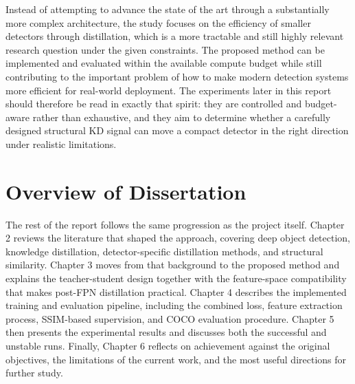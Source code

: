 Instead of attempting to advance the state of the art through a substantially more complex architecture, the study focuses on the efficiency of smaller detectors through distillation, which is a more tractable and still highly relevant research question under the given constraints. The proposed method can be implemented and evaluated within the available compute budget while still contributing to the important problem of how to make modern detection systems more efficient for real-world deployment. The experiments later in this report should therefore be read in exactly that spirit: they are controlled and budget-aware rather than exhaustive, and they aim to determine whether a carefully designed structural KD signal can move a compact detector in the right direction under realistic limitations.

\section{Overview of Dissertation}

The rest of the report follows the same progression as the project itself. Chapter 2 reviews the literature that shaped the approach, covering deep object detection, knowledge distillation, detector-specific distillation methods, and structural similarity. Chapter 3 moves from that background to the proposed method and explains the teacher-student design together with the feature-space compatibility that makes post-FPN distillation practical. Chapter 4 describes the implemented training and evaluation pipeline, including the combined loss, feature extraction process, SSIM-based supervision, and COCO evaluation procedure. Chapter 5 then presents the experimental results and discusses both the successful and unstable runs. Finally, Chapter 6 reflects on achievement against the original objectives, the limitations of the current work, and the most useful directions for further study.
